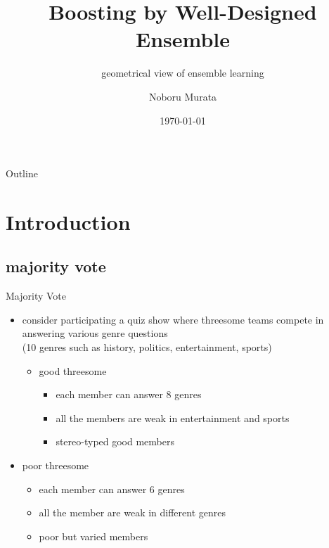 \documentclass[fleqn,aspectratio=1610]{beamer}
\author{Noboru Murata}
\date{\today}
\title{Boosting by Well-Designed Ensemble}
\subtitle{geometrical view of ensemble learning}
\institute{\url{https://noboru-murata.github.io/}}
\begin{document}
\maketitle
\begin{frame}{Outline}
\tableofcontents
\end{frame}


\section{Introduction}
\label{sec:orgdf62fc8}
\subsection{majority vote}
\label{sec:orgf52a847}
\begin{frame}[label={sec:org0e0a9ac}]{Majority Vote}
\begin{itemize}
\item <1-> consider participating a quiz show where 
threesome teams compete in answering various genre questions \\[0pt]
(10 genres such as history, politics, entertainment, sports)
\vspace{10pt}
\begin{itemize}
\item <2-> good threesome
\begin{itemize}
\item <3-> each member can answer 8 genres
\item <3-> all the members are weak in entertainment and sports
\item <3-> \alert{stereo-typed good members}
\end{itemize}
\end{itemize}
\vspace{10pt}
\item <2-> poor threesome 
\begin{itemize}
\item <3-> each member can answer 6 genres
\item <3-> all the member are weak in different genres
\item <3-> \alert{poor but varied members}
\end{itemize}
\end{itemize}
\end{frame}
\end{document}
